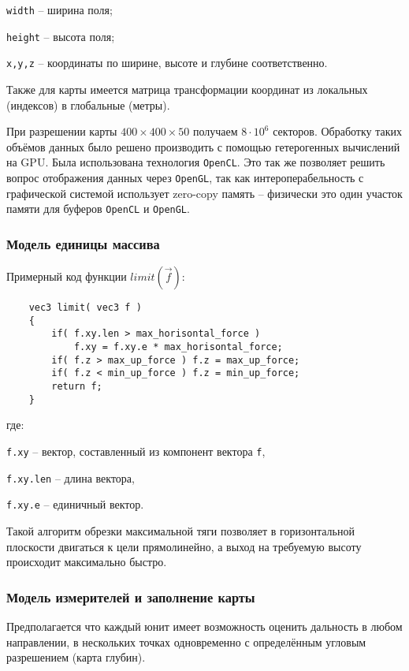 \verb|width| -- ширина поля;

\verb|height| -- высота поля;

\verb|x,y,z| -- координаты по ширине, высоте и глубине соответственно.

Также для карты имеется матрица трансформации координат из локальных (индексов)
в глобальные (метры).

При разрешении карты $400 \times 400 \times 50$ получаем $8 \cdot 10^6$ секторов.
Обработку таких объёмов данных было решено производить с помощью гетерогенных 
вычислений на GPU. Была использована технология \verb|OpenCL|. Это так же 
позволяет решить вопрос отображения данных через \verb|OpenGL|, так как
интероперабельность с графической системой использует zero-copy память -- 
физически это один участок памяти для буферов \verb|OpenCL| и \verb|OpenGL|.

\newpage
\subsubsection{Модель единицы массива}

Примерный код функции $limit \left( \vec f \right)$:

\begin{verbatim}
    vec3 limit( vec3 f )
    {
        if( f.xy.len > max_horisontal_force )
            f.xy = f.xy.e * max_horisontal_force;
        if( f.z > max_up_force ) f.z = max_up_force;
        if( f.z < min_up_force ) f.z = min_up_force;
        return f;
    }
\end{verbatim}

где:

\verb|f.xy| -- вектор, составленный из компонент вектора \verb|f|,

\verb|f.xy.len| -- длина вектора,

\verb|f.xy.e| -- единичный вектор.

Такой алгоритм обрезки максимальной тяги позволяет в горизонтальной плоскости двигаться к цели прямолинейно,
а выход на требуемую высоту происходит максимально быстро.

\newpage
\subsubsection{Модель измерителей и заполнение карты}

Предполагается что каждый юнит имеет возможность
оценить дальность в любом направлении, в нескольких точках одновременно с определённым 
угловым разрешением (карта глубин).

